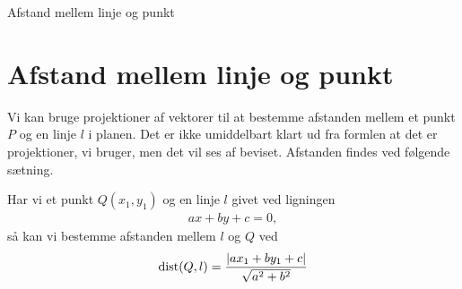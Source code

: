 \begin{center}
\Huge
Afstand mellem linje og punkt
\end{center}

\section*{Afstand mellem linje og punkt}

Vi kan bruge projektioner af vektorer til at bestemme afstanden mellem et punkt $P$ og en linje $l$ i planen. Det er ikke umiddelbart klart ud fra formlen at det er projektioner, vi bruger, men det vil ses af beviset. Afstanden findes ved følgende sætning. 

\begin{setn}
Har vi et punkt $Q(x_1,y_1)$ og en linje $l$ givet ved ligningen
\begin{align*}
ax+by+c = 0, 
\end{align*}
så kan vi bestemme afstanden mellem $l$ og $Q$ ved
\begin{align*}
\textnormal{dist}(Q,l) = \frac{|ax_1+by_1+c|}{\sqrt{a^2+b^2}}
\end{align*}
\end{setn}
